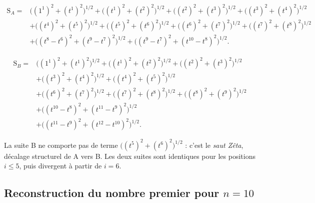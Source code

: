 \documentclass[11pt,a4paper]{article}
\newcommand{\SA}{\mathrm{S}_A}
\newcommand{\SB}{\mathrm{S}_B}
\begin{document}
\begin{boiteformule}
\[
\begin{aligned}
\SA ={}& \bigl((1^{1})^{2} + (t^{1})^{2}\bigr)^{1/2}
 + \bigl((t^{1})^{2} + (t^{2})^{2}\bigr)^{1/2}
 + \bigl((t^{2})^{2} + (t^{3})^{2}\bigr)^{1/2}
 + \bigl((t^{3})^{2} + (t^{4})^{2}\bigr)^{1/2} \\
& + \bigl((t^{4})^{2} + (t^{5})^{2}\bigr)^{1/2}
 + \bigl((t^{5})^{2} + (t^{6})^{2}\bigr)^{1/2}
 + \bigl((t^{6})^{2} + (t^{7})^{2}\bigr)^{1/2}
 + \bigl((t^{7})^{2} + (t^{8})^{2}\bigr)^{1/2} \\
& + \bigl((t^{8} - t^{6})^{2} + (t^{9} - t^{7})^{2}\bigr)^{1/2}
 + \bigl((t^{9} - t^{7})^{2} + (t^{10} - t^{8})^{2}\bigr)^{1/2}.
\end{aligned}
\]
\end{boiteformule}

\begin{boiteformule}
\[
\begin{aligned}
\SB ={}& \bigl((1^{1})^{2} + (t^{1})^{2}\bigr)^{1/2}
 + \bigl((t^{1})^{2} + (t^{2})^{2}\bigr)^{1/2}
 + \bigl((t^{2})^{2} + (t^{3})^{2}\bigr)^{1/2} \\
& + \bigl((t^{3})^{2} + (t^{4})^{2}\bigr)^{1/2}
 + \bigl((t^{4})^{2} + (t^{5})^{2}\bigr)^{1/2} \\
& + \bigl((t^{6})^{2} + (t^{7})^{2}\bigr)^{1/2}
 + \bigl((t^{7})^{2} + (t^{8})^{2}\bigr)^{1/2}
 + \bigl((t^{8})^{2} + (t^{9})^{2}\bigr)^{1/2} \\
& + \bigl((t^{10} - t^{8})^{2} + (t^{11} - t^{9})^{2}\bigr)^{1/2} \\
& + \bigl((t^{11} - t^{9})^{2} + (t^{12} - t^{10})^{2}\bigr)^{1/2}.
\end{aligned}
\]
\end{boiteformule}

\begin{boitenote}
La suite B ne comporte pas de terme $\bigl((t^{5})^{2}+(t^{6})^{2}\bigr)^{1/2}$ :
c'est le \emph{saut Zêta}, décalage structurel de A vers B. Les deux suites sont
identiques pour les positions $i \le 5$, puis divergent à partir de $i = 6$.
\end{boitenote}

\subsection{Reconstruction du nombre premier pour $n = 10$}
\end{document}
